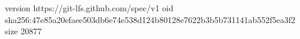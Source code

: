 version https://git-lfs.github.com/spec/v1
oid sha256:47e85a20efaee503db6e74e538d124b80128e7622b3b5b731141ab552f5ea3f2
size 20877

